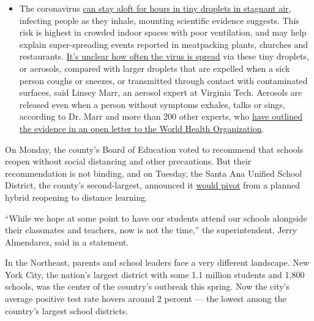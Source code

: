 \begin{itemize}
  \begin{itemize}
  \tightlist
  \item
    The coronavirus
    \href{https://www.nytimes3xbfgragh.onion/2020/07/04/health/239-experts-with-one-big-claim-the-coronavirus-is-airborne.html?action=click\&pgtype=Article\&state=default\&region=MAIN_CONTENT_3\&context=storylines_faq}{can
    stay aloft for hours in tiny droplets in stagnant air}, infecting
    people as they inhale, mounting scientific evidence suggests. This
    risk is highest in crowded indoor spaces with poor ventilation, and
    may help explain super-spreading events reported in meatpacking
    plants, churches and restaurants.
    \href{https://www.nytimes3xbfgragh.onion/2020/07/06/health/coronavirus-airborne-aerosols.html?action=click\&pgtype=Article\&state=default\&region=MAIN_CONTENT_3\&context=storylines_faq}{It's
    unclear how often the virus is spread} via these tiny droplets, or
    aerosols, compared with larger droplets that are expelled when a
    sick person coughs or sneezes, or transmitted through contact with
    contaminated surfaces, said Linsey Marr, an aerosol expert at
    Virginia Tech. Aerosols are released even when a person without
    symptoms exhales, talks or sings, according to Dr. Marr and more
    than 200 other experts, who
    \href{https://academic.oup.com/cid/article/doi/10.1093/cid/ciaa939/5867798}{have
    outlined the evidence in an open letter to the World Health
    Organization}.
  \end{itemize}
\end{itemize}

On Monday, the county's Board of Education voted to recommend that
schools reopen without social distancing and other precautions. But
their recommendation is not binding, and on Tuesday, the Santa Ana
Unified School District, the county's second-largest, announced it
\href{https://www.sausd.us/site/default.aspx?PageType=3\&DomainID=1\&ModuleInstanceID=6157\&ViewID=6446EE88-D30C-497E-9316-3F8874B3E108\&RenderLoc=0\&FlexDataID=96385\&PageID=1}{would
pivot} from a planned hybrid reopening to distance learning.

``While we hope at some point to have our students attend our schools
alongside their classmates and teachers, now is not the time,'' the
superintendent, Jerry Almendarez, said in a statement.

In the Northeast, parents and school leaders face a very different
landscape. New York City, the nation's largest district with some 1.1
million students and 1,800 schools, was the center of the country's
outbreak this spring. Now the city's average positive test rate hovers
around 2 percent --- the lowest among the country's largest school
districts.

